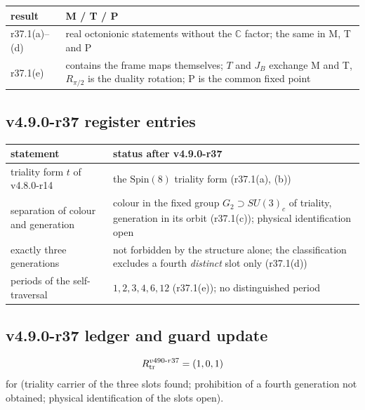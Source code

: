 \begin{center}
\small
\begin{tabular}{@{}>{\raggedright\arraybackslash}p{}>{\raggedright\arraybackslash}p{}@{}}
\toprule
result & M / T / P\\
\midrule
r37.1(a)--(d) & real octonionic statements without the \(\mathbb C\) factor; the same in M, T and P\\
r37.1(e) & contains the frame maps themselves; \(T\) and \(J_B\) exchange M and T, \(R_{\pi/2}\) is the duality rotation; P is the common fixed point\\
\bottomrule
\end{tabular}
\end{center}

\subsection*{v4.9.0-r37 register entries}
\label{subsec:v490-r37-register}

\begin{center}
\small
\begin{tabular}{@{}>{\raggedright\arraybackslash}p{}>{\raggedright\arraybackslash}p{}@{}}
\toprule
statement & status after v4.9.0-r37\\
\midrule
triality form \(t\) of v4.8.0-r14 & the \(\mathrm{Spin}(8)\) triality form (r37.1(a), (b))\\
separation of colour and generation & colour in the fixed group \(G_2\supset SU(3)_c\) of triality, generation in its orbit (r37.1(c)); physical identification open\\
exactly three generations & not forbidden by the structure alone; the classification excludes a fourth \emph{distinct} slot only (r37.1(d))\\
periods of the self-traversal & \(1,2,3,4,6,12\) (r37.1(e)); no distinguished period\\
\bottomrule
\end{tabular}
\end{center}

\subsection*{v4.9.0-r37 ledger and guard update}
\label{subsec:v490-r37-ledger-guard}

\[
R_{\rm tr}^{v490\text{-}r37}=(1,0,1)
\]
for (triality carrier of the three slots found; prohibition of a fourth generation not obtained; physical identification of the
slots open).

